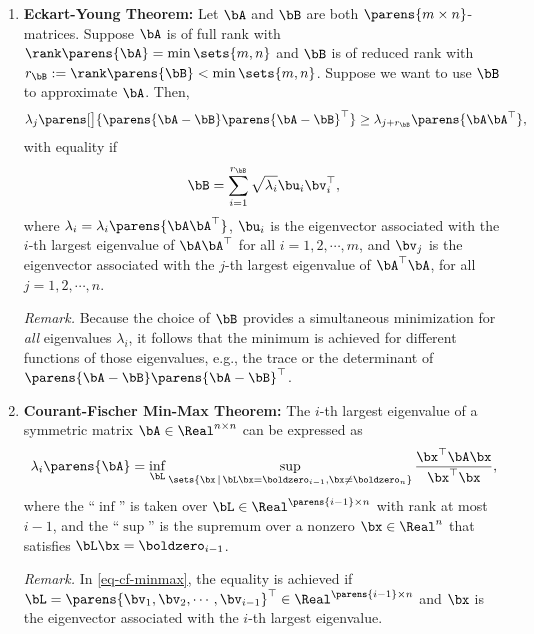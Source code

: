 \documentclass[12pt]{article}
\begin{document}
\begin{enumerate}[label=\textbf{\arabic*.}]
	\item \textbf{Eckart-Young Theorem:} Let $\bA$ and $\bB$ are both $\parens{m \times n}$-matrices. Suppose $\bA$ is of full rank with $\rank \parens{\bA} = \min \sets{m, n}$ and $\bB$ is of reduced rank with $r_{\bB} := \rank \parens{\bB} < \min \sets{m, n}$. Suppose we want to use $\bB$ to approximate $\bA$. Then, 
	\begin{align}
		\lambda_j \parens[\big]{ \parens{\bA - \bB} \parens{\bA - \bB}^\top} \ge \lambda_{j+r_{\bB}} \parens{\bA\bA^\top}, 
	\end{align}
	with equality if 
	\begin{align*}
		\bB = \sum_{i=1}^{r_{\bB}} \sqrt{\lambda_i} \bu_i \bv_i^\top, 
	\end{align*}
	where $\lambda_i = \lambda_i \parens{\bA \bA^\top}$, $\bu_i$ is the eigenvector associated with the $i$-th largest eigenvalue of $\bA \bA^\top$ for all $i = 1, 2, \cdots, m$, and $\bv_j$ is the eigenvector associated with the $j$-th largest eigenvalue of $\bA^\top \bA$, for all $j = 1, 2, \cdots, n$. 
	
	\textit{Remark.} Because the choice of $\bB$ provides a simultaneous minimization for \emph{all} eigenvalues $\lambda_i$, it follows that the minimum is achieved for different functions of those eigenvalues, e.g., the trace or the determinant of $\parens{\bA - \bB} \parens{\bA - \bB}^\top$. 
	
	\item \textbf{Courant-Fischer Min-Max Theorem:} The $i$-th largest eigenvalue of a symmetric matrix $\bA \in \Real^{n \times n}$ can be expressed as 
	\begin{align}\label{eq-cf-minmax}
		\lambda_i \parens{\bA} = \inf_{\bL} \sup_{\sets{\bx \,\vert\, \bL \bx = \boldzero_{i-1}, \bx \neq \boldzero_n}} \frac{\bx^\top \bA \bx}{\bx^\top \bx}, 
	\end{align}
	where the ``$\inf$'' is taken over $\bL \in \Real^{\parens{i-1} \times n}$ with rank at most $i-1$, and the ``$\sup$'' is the supremum over a nonzero $\bx \in \Real^n$ that satisfies $\bL \bx = \boldzero_{i-1}$. 
	
	\textit{Remark.} In \eqref{eq-cf-minmax}, the equality is achieved if $\bL = \parens{\bv_1, \bv_2, \cdots, \bv_{i-1}}^\top \in \Real^{\parens{i-1} \times n}$ and $\bx$ is the eigenvector associated with the $i$-th largest eigenvalue. 
	

\end{enumerate}
\end{document}
